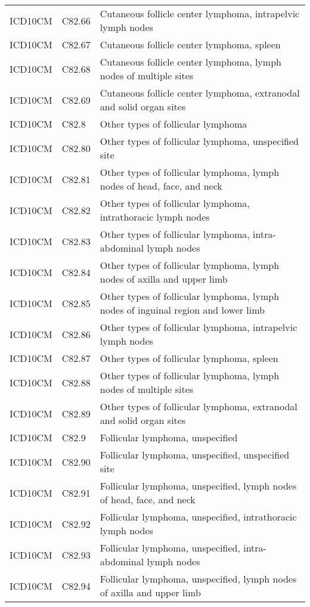\begin{longtable}{p{}p{}p{}}
  ICD10CM & C82.66 & Cutaneous follicle center lymphoma, intrapelvic lymph nodes \\ 
  ICD10CM & C82.67 & Cutaneous follicle center lymphoma, spleen \\ 
  ICD10CM & C82.68 & Cutaneous follicle center lymphoma, lymph nodes of multiple sites \\ 
  ICD10CM & C82.69 & Cutaneous follicle center lymphoma, extranodal and solid organ sites \\ 
  ICD10CM & C82.8 & Other types of follicular lymphoma \\ 
  ICD10CM & C82.80 & Other types of follicular lymphoma, unspecified site \\ 
  ICD10CM & C82.81 & Other types of follicular lymphoma, lymph nodes of head, face, and neck \\ 
  ICD10CM & C82.82 & Other types of follicular lymphoma, intrathoracic lymph nodes \\ 
  ICD10CM & C82.83 & Other types of follicular lymphoma, intra-abdominal lymph nodes \\ 
  ICD10CM & C82.84 & Other types of follicular lymphoma, lymph nodes of axilla and upper limb \\ 
  ICD10CM & C82.85 & Other types of follicular lymphoma, lymph nodes of inguinal region and lower limb \\ 
  ICD10CM & C82.86 & Other types of follicular lymphoma, intrapelvic lymph nodes \\ 
  ICD10CM & C82.87 & Other types of follicular lymphoma, spleen \\ 
  ICD10CM & C82.88 & Other types of follicular lymphoma, lymph nodes of multiple sites \\ 
  ICD10CM & C82.89 & Other types of follicular lymphoma, extranodal and solid organ sites \\ 
  ICD10CM & C82.9 & Follicular lymphoma, unspecified \\ 
  ICD10CM & C82.90 & Follicular lymphoma, unspecified, unspecified site \\ 
  ICD10CM & C82.91 & Follicular lymphoma, unspecified, lymph nodes of head, face, and neck \\ 
  ICD10CM & C82.92 & Follicular lymphoma, unspecified, intrathoracic lymph nodes \\ 
  ICD10CM & C82.93 & Follicular lymphoma, unspecified, intra-abdominal lymph nodes \\ 
  ICD10CM & C82.94 & Follicular lymphoma, unspecified, lymph nodes of axilla and upper limb \\ 

\end{longtable}
